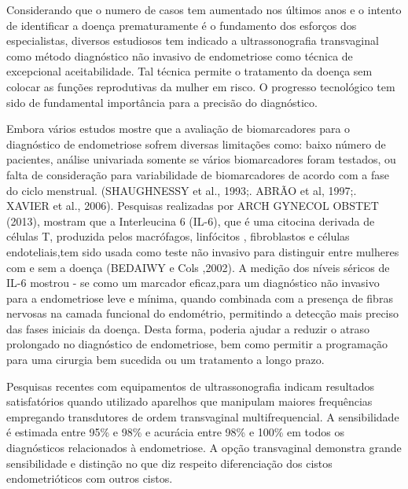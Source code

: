 \documentclass[12pt]{article} %
\begin{document}
Considerando que o numero de casos tem aumentado nos últimos anos e o intento de
identificar a doença prematuramente é o fundamento dos esforços dos especialistas, diversos estudiosos tem indicado a ultrassonografia transvaginal como método diagnóstico não invasivo de endometriose como técnica de excepcional aceitabilidade.  Tal técnica permite o tratamento da doença sem colocar as funções reprodutivas da mulher em risco. O progresso tecnológico tem sido de fundamental importância para a precisão do diagnóstico.

Embora vários estudos mostre que a avaliação de biomarcadores para o diagnóstico de endometriose sofrem diversas limitações como: baixo número de pacientes, análise univariada somente se vários biomarcadores foram testados, ou falta de consideração para variabilidade de biomarcadores de acordo com a fase do ciclo menstrual. (SHAUGHNESSY et al., 1993;. ABRÃO et al, 1997;. XAVIER et al., 2006).
Pesquisas realizadas por ARCH GYNECOL OBSTET (2013), mostram que a Interleucina 6 (IL-6), que é uma citocina derivada de células T, produzida pelos macrófagos, linfócitos , fibroblastos e células endoteliais,tem sido usada como teste não invasivo para distinguir entre mulheres com e sem a doença (BEDAIWY e Cols ,2002). A medição dos níveis séricos de
IL-6 mostrou - se como um marcador eficaz,para um diagnóstico não invasivo para a endometriose leve e mínima, quando combinada com a presença de fibras nervosas na camada funcional do endométrio, permitindo a detecção mais preciso das fases iniciais da doença. Desta forma,  poderia ajudar a
reduzir o atraso prolongado no diagnóstico de endometriose,
bem como permitir a programação para uma cirurgia bem sucedida ou um tratamento a longo prazo.


Pesquisas recentes com equipamentos de ultrassonografia indicam resultados satisfatórios quando utilizado aparelhos que manipulam maiores frequências empregando transdutores de ordem transvaginal multifrequencial. A sensibilidade é estimada entre 95\% e 98\% e acurácia entre 98\% e 100\% em todos os diagnósticos relacionados à endometriose. A opção transvaginal demonstra grande sensibilidade e distinção no que diz respeito diferenciação dos cistos endometrióticos com outros cistos.
\end{document}
